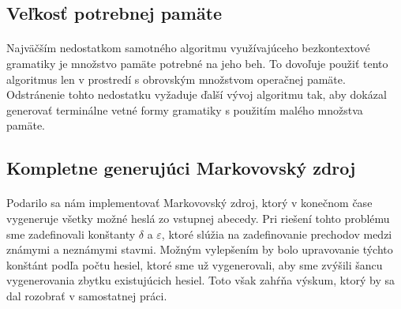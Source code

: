 \subsection{Veľkosť potrebnej pamäte}
\paragraph{}
Najväčším nedostatkom samotného algoritmu využívajúceho bezkontextové gramatiky je množstvo pamäte potrebné na jeho beh. To dovoľuje použiť tento algoritmus len v prostredí s obrovským množstvom operačnej pamäte. Odstránenie tohto nedostatku vyžaduje ďalší vývoj algoritmu tak, aby dokázal generovať terminálne vetné formy gramatiky s použitím malého množstva pamäte.

\subsection{Kompletne generujúci Markovovský zdroj}
\paragraph{}
Podarilo sa nám implementovať Markovovský zdroj, ktorý v konečnom čase vygeneruje všetky možné heslá zo vstupnej abecedy. Pri riešení tohto problému sme zadefinovali konštanty \(\delta\) a \(\varepsilon\), ktoré slúžia na zadefinovanie prechodov medzi známymi a neznámymi stavmi. Možným vylepšením by bolo upravovanie týchto konštánt podľa počtu hesiel, ktoré sme už vygenerovali, aby sme zvýšili šancu vygenerovania zbytku existujúcich hesiel. Toto však zahŕňa výskum, ktorý by sa dal rozobrať v samostatnej práci.
